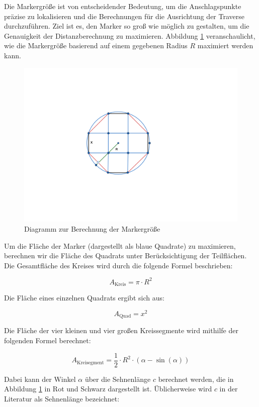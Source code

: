 Die Markergröße ist von entscheidender Bedeutung, um die Anschlagspunkte präzise 
zu lokalisieren und die Berechnungen für die Ausrichtung der Traverse durchzuführen. 
Ziel ist es, den Marker so groß wie möglich zu gestalten, um die Genauigkeit der 
Distanzberechnung zu maximieren. Abbildung \ref{fig:marker} veranschaulicht, wie die Markergröße 
basierend auf einem gegebenen Radius \( R \) maximiert werden kann.

\begin{figure}[H]
    \centering
    \includegraphics[width=\linewidth]{graphics/marker.png}
    \caption{Diagramm zur Berechnung der Markergröße}
    \label{fig:marker}
\end{figure}

Um die Fläche der Marker (dargestellt als blaue Quadrate) zu maximieren, berechnen wir die Fläche des Quadrats unter Berücksichtigung der Teilflächen. Die Gesamtfläche des Kreises wird durch die folgende Formel beschrieben:

\[
A_\text{Kreis} = \pi \cdot R^2
\]

Die Fläche eines einzelnen Quadrats ergibt sich aus:

\[
A_{\text{Quad}} = x^2
\]

Die Fläche der vier kleinen und vier großen Kreissegmente wird mithilfe der folgenden Formel berechnet:

\[
A_\text{Kreisegment} = \frac{1}{2} \cdot R^2 \cdot (\alpha - \sin(\alpha))
\]

Dabei kann der Winkel \(\alpha\) über die Sehnenlänge \(c\) berechnet werden, die in Abbildung \ref{fig:marker} in Rot und Schwarz dargestellt ist. Üblicherweise wird \(c\) in der Literatur als Sehnenlänge bezeichnet:

